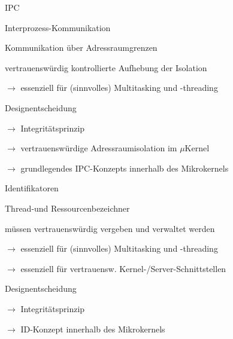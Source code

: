 \documentclass[a4paper]{article}
\begin{document}
\begin{multicols}{3}
    IPC
    \begin{itemize*}
        \item Interprozess-Kommunikation
        \begin{itemize*}
            \item Kommunikation über Adressraumgrenzen
            \item vertrauenswürdig kontrollierte Aufhebung der Isolation
            \item[$\rightarrow$] essenziell für (sinnvolles) Multitasking und -threading
        \end{itemize*}
        \item Designentscheidung
        \begin{itemize*}
            \item[$\rightarrow$] Integritätsprinzip
            \item[$\rightarrow$] vertrauenswürdige Adressraumisolation im $\mu$Kernel
            \item[$\rightarrow$] grundlegendes IPC-Konzepts innerhalb des Mikrokernels
        \end{itemize*}
    \end{itemize*}

    Identifikatoren
    \begin{itemize*}
        \item Thread-und Ressourcenbezeichner
        \begin{itemize*}
            \item müssen vertrauenswürdig vergeben und verwaltet werden
            \item[$\rightarrow$] essenziell für (sinnvolles) Multitasking und -threading
            \item[$\rightarrow$] essenziell für vertrauensw. Kernel-/Server-Schnittstellen
        \end{itemize*}
        \item Designentscheidung
        \begin{itemize*}
            \item[$\rightarrow$] Integritätsprinzip
            \item[$\rightarrow$] ID-Konzept innerhalb des Mikrokernels
        \end{itemize*}
    \end{itemize*}


\end{multicols}
\end{document}
